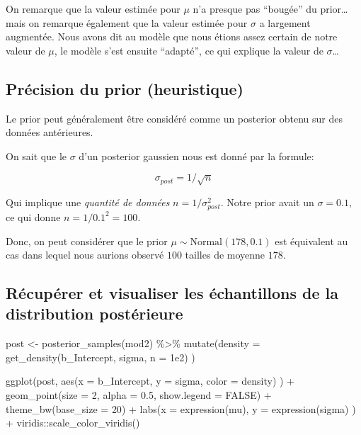 \documentclass[
  a4paper,11pt,twoside,onecolumn,openright,final,oldfontcommands]{memoir}
\newenvironment{Shaded}{\begin{snugshade}}{\end{snugshade}}
\newcommand{\AttributeTok}[1]{\textcolor[rgb]{0.77,0.63,0.00}{#1}}
\newcommand{\ConstantTok}[1]{\textcolor[rgb]{0.00,0.00,0.00}{#1}}
\newcommand{\DecValTok}[1]{\textcolor[rgb]{0.00,0.00,0.81}{#1}}
\newcommand{\FloatTok}[1]{\textcolor[rgb]{0.00,0.00,0.81}{#1}}
\newcommand{\FunctionTok}[1]{\textcolor[rgb]{0.00,0.00,0.00}{#1}}
\newcommand{\NormalTok}[1]{#1}
\newcommand{\OtherTok}[1]{\textcolor[rgb]{0.56,0.35,0.01}{#1}}
\newcommand{\SpecialCharTok}[1]{\textcolor[rgb]{0.00,0.00,0.00}{#1}}
\theoremstyle{definition}
\theoremstyle{definition}
\theoremstyle{definition}
\theoremstyle{definition}
\theoremstyle{remark}
\begin{document}
On remarque que la valeur estimée pour \(\mu\) n'a presque pas ``bougée'' du prior\ldots mais on remarque également que la valeur estimée pour \(\sigma\) a largement augmentée. Nous avons dit au modèle que nous étions assez certain de notre valeur de \(\mu\), le modèle s'est ensuite ``adapté'', ce qui explique la valeur de \(\sigma\)\ldots{}

\hypertarget{pruxe9cision-du-prior-heuristique}{%
\subsection{Précision du prior (heuristique)}\label{pruxe9cision-du-prior-heuristique}}

Le prior peut généralement être considéré comme un posterior obtenu sur des données antérieures.

On sait que le \(\sigma\) d'un posterior gaussien nous est donné par la formule:

\[\sigma_{post} = 1 / \sqrt{n}\]

Qui implique une \emph{quantité de données} \(n = 1 / \sigma^2_{post}\). Notre prior avait un \(\sigma = 0.1\), ce qui donne \(n = 1 / 0.1^2 = 100\).

Donc, on peut considérer que le prior \(\mu \sim \mathrm{Normal}(178, 0.1)\) est équivalent au cas dans lequel nous aurions observé \(100\) tailles de moyenne \(178\).

\hypertarget{ruxe9cupuxe9rer-et-visualiser-les-uxe9chantillons-de-la-distribution-postuxe9rieure}{%
\subsection{Récupérer et visualiser les échantillons de la distribution postérieure}\label{ruxe9cupuxe9rer-et-visualiser-les-uxe9chantillons-de-la-distribution-postuxe9rieure}}

\begin{Shaded}
\begin{Highlighting}[]
\NormalTok{post }\OtherTok{\textless{}{-}} \FunctionTok{posterior\_samples}\NormalTok{(mod2) }\SpecialCharTok{\%\textgreater{}\%}
    \FunctionTok{mutate}\NormalTok{(}\AttributeTok{density =} \FunctionTok{get\_density}\NormalTok{(b\_Intercept, sigma, }\AttributeTok{n =} \FloatTok{1e2}\NormalTok{) )}

\FunctionTok{ggplot}\NormalTok{(post, }\FunctionTok{aes}\NormalTok{(}\AttributeTok{x =}\NormalTok{ b\_Intercept, }\AttributeTok{y =}\NormalTok{ sigma, }\AttributeTok{color =}\NormalTok{ density) ) }\SpecialCharTok{+}
    \FunctionTok{geom\_point}\NormalTok{(}\AttributeTok{size =} \DecValTok{2}\NormalTok{, }\AttributeTok{alpha =} \FloatTok{0.5}\NormalTok{, }\AttributeTok{show.legend =} \ConstantTok{FALSE}\NormalTok{) }\SpecialCharTok{+}
    \FunctionTok{theme\_bw}\NormalTok{(}\AttributeTok{base\_size =} \DecValTok{20}\NormalTok{) }\SpecialCharTok{+}
    \FunctionTok{labs}\NormalTok{(}\AttributeTok{x =} \FunctionTok{expression}\NormalTok{(mu), }\AttributeTok{y =} \FunctionTok{expression}\NormalTok{(sigma) ) }\SpecialCharTok{+}
\NormalTok{    viridis}\SpecialCharTok{::}\FunctionTok{scale\_color\_viridis}\NormalTok{()}
\end{Highlighting}
\end{Shaded}
\end{document}
